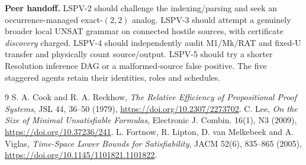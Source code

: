 \documentclass[11pt]{article}
\begin{document}
\textbf{Peer handoff.} LSPV-2 should challenge the indexing/parsing and seek an occurrence-managed exact-\((2,2)\) analog. LSPV-3 should attempt a genuinely broader local UNSAT grammar on connected hostile sources, with certificate \emph{discovery} charged. LSPV-4 should independently audit M1/Mk/RAT and fixed-U transfer and physically count source/output. LSPV-5 should try a shorter Resolution inference DAG or a malformed-source false positive. The five staggered agents retain their identities, roles and schedules.

\begin{thebibliography}{9}
 S. A. Cook and R. A. Reckhow, \emph{The Relative Efficiency of Propositional Proof Systems}, JSL 44, 36--50 (1979), \url{https://doi.org/10.2307/2273702}.
 C. Lee, \emph{On the Size of Minimal Unsatisfiable Formulas}, Electronic J. Combin. 16(1), N3 (2009), \url{https://doi.org/10.37236/241}.
 L. Fortnow, R. Lipton, D. van Melkebeek and A. Viglas, \emph{Time-Space Lower Bounds for Satisfiability}, JACM 52(6), 835--865 (2005), \url{https://doi.org/10.1145/1101821.1101822}.
\end{thebibliography}
\end{document}
